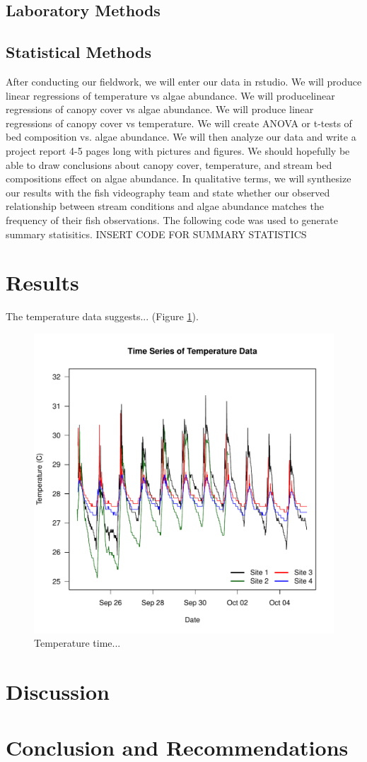 \documentclass{article}
\begin{document}
\subsection{Laboratory Methods}

\subsection{Statistical Methods}
After conducting our ﬁeldwork, we will enter our data in rstudio. We will produce linear regressions of temperature vs algae abundance. We will producelinear regressions of canopy cover vs algae abundance. We will produce linear regressions of canopy cover vs temperature. We will create ANOVA or t-tests of bed composition vs. algae abundance. We will then analyze our data and write a project report 4-5 pages long with pictures and ﬁgures. We should hopefully be able to draw conclusions about canopy cover, temperature, and stream bed compositions eﬀect on algae abundance. In qualitative terms, we will synthesize our results with the ﬁsh videography team and state whether our observed relationship between stream conditions and algae abundance matches the frequency of their ﬁsh observations.
The following code was used to generate summary statisitics. 
INSERT CODE FOR SUMMARY STATISTICS

\section{Results}

The temperature data suggests... (Figure \ref{Temp}).

\begin{figure}
\includegraphics{Figures/Temp}
\caption{Temperature time...}
\label{Temp}
\end{figure}

\section{Discussion}


\section{Conclusion and Recommendations}
\end{document}
